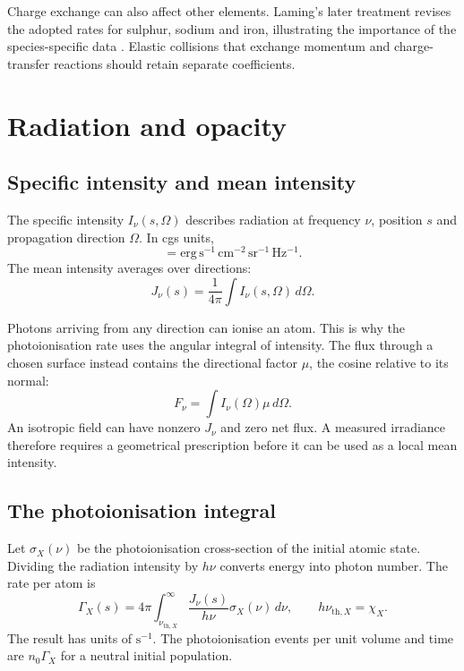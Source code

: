 \documentclass[a4paper,10pt,twoside,openany]{book}
\newcommand{\ChapColor}{Cap1Blue}
\newcommand{\ChapColorLight}{LightBlue}
\newcommand{\setChapColor}[2]{%
  \renewcommand{\ChapColor}{#1}%
  \renewcommand{\ChapColorLight}{#2}}
\numberwithin{equation}{chapter}
\begin{document}
Charge exchange can also affect other elements. Laming's later
treatment revises the adopted rates for sulphur, sodium and iron,
illustrating the importance of the species-specific data
\cite{Laming2021}. Elastic collisions that exchange momentum and
charge-transfer reactions should retain separate coefficients.

\setChapColor{Cap3Green}{LightGreen}
\chapter{Radiation and opacity}

\section{Specific intensity and mean intensity}
The specific intensity $I_\nu(s,\Omega)$ describes radiation at
frequency $\nu$, position $s$ and propagation direction $\Omega$.
In cgs units,
\begin{equation}
  [I_\nu]=
  \mathrm{erg\,s^{-1}\,cm^{-2}\,sr^{-1}\,Hz^{-1}}.
\end{equation}
The mean intensity averages over directions:
\begin{equation}
  J_\nu(s)=\frac{1}{4\pi}\int I_\nu(s,\Omega)\,d\Omega.
  \label{eq:mean_intensity}
\end{equation}

Photons arriving from any direction can ionise an atom. This is why
the photoionisation rate uses the angular integral of intensity.
The flux through a chosen surface instead contains the directional
factor $\mu$, the cosine relative to its normal:
\begin{equation}
  F_\nu=\int I_\nu(\Omega)\mu\,d\Omega.
\end{equation}
An isotropic field can have nonzero $J_\nu$ and zero net flux.
A measured irradiance therefore requires a geometrical prescription
before it can be used as a local mean intensity.

\section{The photoionisation integral}
Let $\sigma_X(\nu)$ be the photoionisation cross-section of the
initial atomic state. Dividing the radiation intensity by $h\nu$
converts energy into photon number. The rate per atom is
\begin{equation}
  \Gamma_X(s)=4\pi
    \int_{\nu_{\mathrm{th},X}}^\infty
    \frac{J_\nu(s)}{h\nu}\sigma_X(\nu)\,d\nu,
  \qquad h\nu_{\mathrm{th},X}=\chi_X.
  \label{eq:gamma_nu}
\end{equation}
The result has units of $\mathrm{s^{-1}}$. The photoionisation
events per unit volume and time are $n_0\Gamma_X$ for a neutral
initial population.
\end{document}

